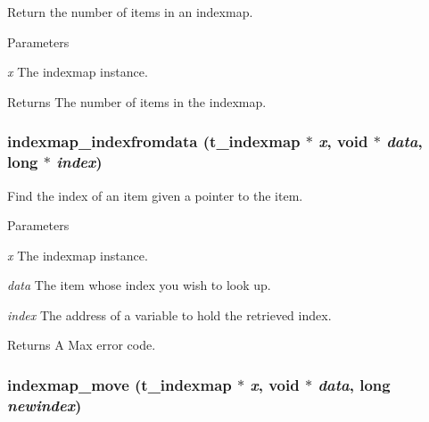 Return the number of items in an indexmap. 
\begin{DoxyParams}{Parameters}
\item[{\em x}]The indexmap instance. \end{DoxyParams}
\begin{DoxyReturn}{Returns}
The number of items in the indexmap. 
\end{DoxyReturn}
\hypertarget{group__indexmap_gab8e003b8468a0e4b1f5b0a16b18a9652}{
\subsubsection[{indexmap\_\-indexfromdata}]{ indexmap\_\-indexfromdata ({\bf t\_\-indexmap} $\ast$ {\em x}, \/  void $\ast$ {\em data}, \/  long $\ast$ {\em index})}}
\label{group__indexmap_gab8e003b8468a0e4b1f5b0a16b18a9652}


Find the index of an item given a pointer to the item. 
\begin{DoxyParams}{Parameters}
\item[{\em x}]The indexmap instance. \item[{\em data}]The item whose index you wish to look up. \item[{\em index}]The address of a variable to hold the retrieved index. \end{DoxyParams}
\begin{DoxyReturn}{Returns}
A Max error code. 
\end{DoxyReturn}
\hypertarget{group__indexmap_gab5f2093d1eb48203117b8bfc32ea5c31}{
\subsubsection[{indexmap\_\-move}]{ indexmap\_\-move ({\bf t\_\-indexmap} $\ast$ {\em x}, \/  void $\ast$ {\em data}, \/  long {\em newindex})}}
\label{group__indexmap_gab5f2093d1eb48203117b8bfc32ea5c31}


